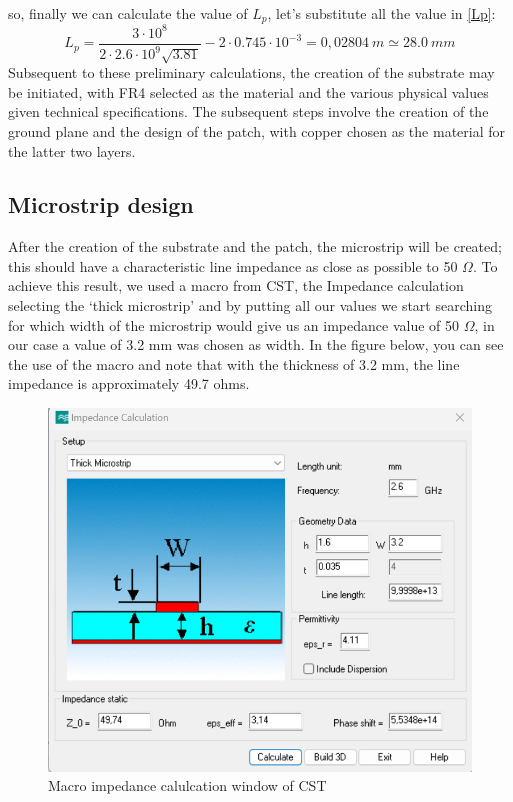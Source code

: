 \documentclass[]{article}
\begin{document}
so, finally we can calculate the value of $L_p$, let's substitute all the value in \eqref{Lp}: 
\[L_p = \frac{3 \cdot 10^8}{2\cdot 2.6 \cdot 10^9 \sqrt{3.81}} - 2\cdot 0.745 \cdot 10^{-3} = 0,02804 \ m \simeq 28.0 \ mm
 \]
  Subsequent to these preliminary calculations, the creation of the substrate may be initiated, with FR4 selected as the material and the various physical values given technical specifications. The subsequent steps involve the creation of the ground plane and the design of the patch, with copper chosen as the material for the latter two layers.
 \newpage
 \subsection{Microstrip design}
 After the creation of the substrate and the patch, the microstrip will be created; this should have a characteristic line impedance as close as possible to 50 $\Omega$.
 To achieve this result, we used a macro from CST, the Impedance calculation selecting the ‘thick microstrip’ and by putting all our values we start searching for which width of the microstrip would give us an impedance value of 50 $\Omega$, in our case a value of 3.2 mm was chosen as width.
 In the figure below, you can see the use of the macro and note that with the thickness of 3.2 mm, the line impedance is approximately 49.7 ohms.
\begin{figure}[h]
	\centering
	\includegraphics[width=0.4\linewidth]{img/img4}
	\caption{Macro impedance calulcation window of CST}
	\label{fig:img4}
\end{figure}
\end{document}

